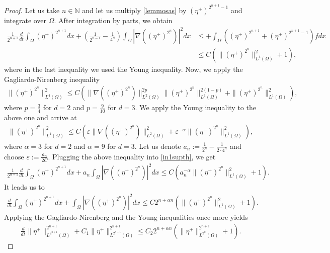 \documentclass[11pt]{article}
\numberwithin{equation}{section}
\theoremstyle{plain}
\newcommand{\n}{\mathbb{N}}
\newcommand{\tn}{\Omega}
\newcommand{\io}{\int_{\Omega}}
\newcommand{\ld}{L^2(\Omega)}
\newcommand{\ddt}{\frac{d}{dt}}
\let \epsilon\varepsilon
\begin{document}
\begin{proof}
Let us take $n\in\n$ and let us multiply \eqref{lemmosas} by $\left(\eta^+\right)^{2^{n+1}-1}$ and integrate over $\Omega$. After integration by parts, we obtain
\begin{align}\label{in1supth}
\frac1{2^{n+1}}\ddt\io(\eta^+)^{2^{n+1}}dx+\left(\frac1{2^{n-1}}-\frac1{4^n}\right)\io\left|\nabla\left((\eta^+)^{2^n}\right)\right|^2dx&\leq +\io \left((\eta^+)^{2^{n+1}}+(\eta^+)^{2^{n+1}-1}\right)f dx\nonumber\\
&\leq C( \|(\eta^+)^{2^n}\|_{L^4(\tn)}^2+1),
\end{align}
where in the last inequality we used the Young inequality. Now, we apply the Gagliardo-Nirenberg inequality
\begin{align*}
\|(\eta^+)^{2^n}\|_{L^4(\tn)}^2\leq C(\|\nabla\left((\eta^+)^{2^n}\right)\|_{\ld}^{2p}\|(\eta^+)^{2^n}\|_{L^1(\Omega)}^{2(1-p)}+\|(\eta^+)^{2^n}\|^2_{L^1(\Omega)}),
\end{align*}
where $p=\frac34$ for $d=2$ and $p=\frac9{10}$ for $d=3$. We apply the Young inequality to the above one and arrive at
\begin{align*}
\|(\eta^+)^{2^n}\|_{L^4(\Omega)}^2\leq C(\epsilon\|\nabla\left((\eta^+)^{2^n}\right)\|_{\ld}^{2}+\epsilon^{-\alpha}\|(\eta^+)^{2^n}\|_{L^1(\Omega)}^2),
\end{align*}
where $\alpha=3$ for $d=2$ and $\alpha=9$ for $d=3$. Let us denote $a_n:=\frac1{2^{n}}-\frac1{2\cdot4^n}$ and choose $\epsilon:=\frac{a_n}{2C}$. Plugging the above inequality into \eqref{in1supth}, we get
\begin{align*}
\frac1{2^{n+1}}\ddt\io(\eta^+)^{2^{n+1}}dx+a_n\io\left|\nabla\left((\eta^+)^{2^n}\right)\right|^2dx\leq C( a_n^{-\alpha}\|(\eta^+)^{2^n}\|_{L^1(\Omega)}^2+1).
\end{align*}
It leads us to
\begin{align*}
\ddt\io(\eta^+)^{2^{n+1}}dx+\io\left|\nabla\left((\eta^+)^{2^n}\right)\right|^2dx\leq C 2^{n+\alpha n}(\|(\eta^+)^{2^n}\|_{L^1(\Omega)}^2+1).
\end{align*}
Applying the Gagliardo-Nirenberg and the Young inequalities once more yields
\begin{align*}
\ddt \|\eta^+\|_{L^{2^{n+1}}(\Omega)}^{2^{n+1}}+C_1\|\eta^+\|_{L^{2^{n+1}}(\Omega)}^{2^{n+1}}\leq C_2 2^{n+\alpha n}(\|\eta^+\|_{L^{2^n}(\Omega)}^{2^{n+1}}+1).
\end{align*}


\end{proof}
\end{document}

